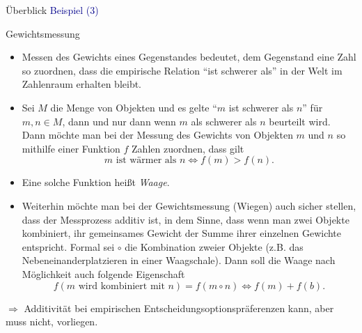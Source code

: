 \documentclass[
  8pt,
  ignorenonframetext,
]{beamer}
\begin{document}
\begin{frame}{Überblick}
\protect\hypertarget{uxfcberblick-4}{}
\textcolor{darkblue}{Beispiel (3)}

\small

Gewichtsmessung

\begin{itemize}
\item
  \justifying Messen des Gewichts eines Gegenstandes bedeutet, dem
  Gegenstand eine Zahl so zuordnen, dass die empirische Relation ``ist
  schwerer als'' in der Welt im Zahlenraum erhalten bleibt.
\item
  Sei \(M\) die Menge von Objekten und es gelte ``\(m\) ist schwerer als
  \(n\)'' für \(m,n\in M\), dann und nur dann wenn \(m\) als schwerer
  als \(n\) beurteilt wird. Dann möchte man bei der Messung des Gewichts
  von Objekten \(m\) und \(n\) so mithilfe einer Funktion \(f\) Zahlen
  zuordnen, dass gilt \begin{equation}
  m \mbox{ ist wärmer als } n \Leftrightarrow f(m) > f(n).
  \end{equation}
\item
  Eine solche Funktion heißt \emph{Waage}.
\item
  Weiterhin möchte man bei der Gewichtsmessung (Wiegen) auch sicher
  stellen, dass der Messprozess additiv ist, in dem Sinne, dass wenn man
  zwei Objekte kombiniert, ihr gemeinsames Gewicht der Summe ihrer
  einzelnen Gewichte entspricht. Formal sei \(\circ\) die Kombination
  zweier Objekte (z.B. das Nebeneinanderplatzieren in einer Waagschale).
  Dann soll die Waage nach Möglichkeit auch folgende Eigenschaft
  \begin{equation}
  f(m \mbox{ wird kombiniert mit } n) = f(m \circ n) \Leftrightarrow f(m) + f(b).
  \end{equation}
\end{itemize}

\flushright

\(\Rightarrow\) Additivität bei empirischen
Entscheidungsoptionspräferenzen kann, aber muss nicht, vorliegen.
\end{frame}
\end{document}
